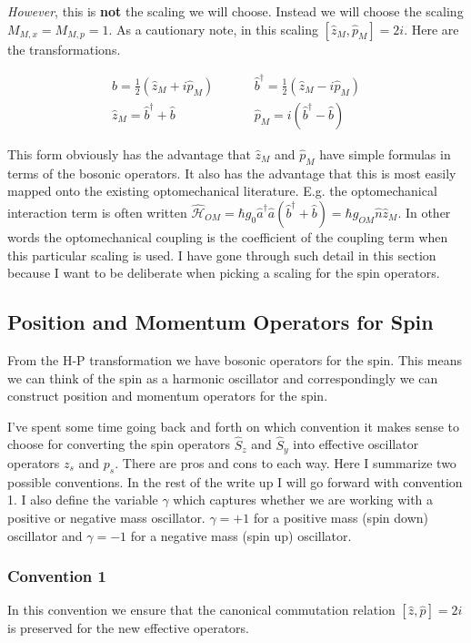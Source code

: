 \documentclass[12pt]{article}
\begin{document}
\textit{However}, this is \textbf{not} the scaling we will choose. Instead we will choose the scaling $M_{M,x} = M_{M,p} = 1$. As a cautionary note, in this scaling $[\hat{z}_{M},\hat{p}_{M}] = 2i$. Here are the transformations.

\begin{align}
\hat{b} = \frac{1}{2} \left(\hat{z}_M + i \hat{p}_M\right) &\hspace{1cm}
\hat{b}^{\dag} = \frac{1}{2}\left(\hat{z}_M - i \hat{p}_M\right) \\
\hat{z}_M = \hat{b}^{\dag} + \hat{b} &\hspace{1cm}
\hat{p}_M = i(\hat{b}^{\dag} - \hat{b})
\end{align}


This form obviously has the advantage that $\hat{z}_M$ and $\hat{p}_M$ have simple formulas in terms of the bosonic operators. It also has the advantage that this is most easily mapped onto the existing optomechanical literature. E.g. the optomechanical interaction term is often written $\hat{\mathcal{H}}_{OM} = \hbar g_0 \hat{a}^{\dag} \hat{a} (\hat{b}^{\dag} + \hat{b}) = \hbar g_{OM} \hat{n} \hat{z}_M$. In other words the optomechanical coupling is the coefficient of the coupling term when this particular scaling is used.
I have gone through such detail in this section because I want to be deliberate when picking a scaling for the spin operators.

\subsection{Position and Momentum Operators for Spin}
From the H-P transformation we have bosonic operators for the spin. This means we can think of the spin as a harmonic oscillator and correspondingly we can construct position and momentum operators for the spin.

I've spent some time going back and forth on which convention it makes sense to choose for converting the spin operators $\hat{S}_z$ and $\hat{S}_y$ into effective oscillator operators $z_s$ and $p_s$. There are pros and cons to each way. Here I summarize two possible conventions. In the rest of the write up I will go forward with convention 1.
I also define the variable $\gamma$ which captures whether we are working with a positive or negative mass oscillator. $\gamma=+1$ for a positive mass (spin down) oscillator and $\gamma = -1$ for a negative mass (spin up) oscillator.
\subsubsection{Convention 1}
In this convention we ensure that the canonical commutation relation $[\hat{z},\hat{p}]=2i$ is preserved for the new effective operators.
\end{document}
